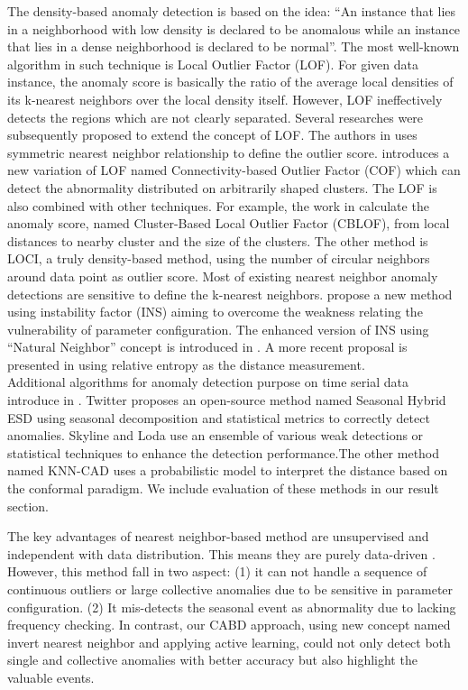 The density-based anomaly detection is based on the idea: “An instance that lies in a neighborhood with low density is declared to be anomalous while an instance that lies in a dense neighborhood is declared to be normal”. The most well-known algorithm in such technique is Local Outlier Factor (LOF)\cite{Breunig:2000:LID:335191.335388}. For given data instance, the anomaly score is basically the ratio of the average local densities of its k-nearest neighbors over the local density itself.  However, LOF ineffectively detects the regions which are not clearly separated. Several researches were subsequently proposed to extend the concept of LOF. The authors in \cite{jin2006ranking} uses symmetric nearest neighbor relationship to define the outlier score. \cite{tang2002enhancing} introduces a new variation of LOF named Connectivity-based Outlier Factor (COF)\cite{tang2001robust} which can detect the abnormality distributed on arbitrarily shaped clusters. The LOF is also combined with other techniques. For example, the work in \cite{he2002outlier}\cite{he2003discovering} calculate the anomaly score, named Cluster-Based Local Outlier Factor (CBLOF), from local distances to nearby cluster and the size of the clusters. The other method is LOCI, a truly density-based method, using the number of circular neighbors around data point as outlier score. Most of existing nearest neighbor anomaly detections are sensitive to define the k-nearest neighbors. \cite{ha2014robust} propose a new method using instability factor (INS) aiming to overcome the weakness relating the vulnerability of parameter configuration. The enhanced version of INS using “Natural Neighbor” concept is introduced in \cite{huang2016non}.
A more recent proposal is presented in \cite{wang2011statistical} using relative entropy as the distance measurement.\\

Additional algorithms for anomaly detection purpose on time serial data introduce in \cite{Lakhina:2004:DNT:1030194.1015492}\cite{1565683}. Twitter proposes an open-source method named Seasonal Hybrid ESD \cite{hochenbaum2017automatic} using seasonal decomposition and statistical metrics to correctly detect anomalies. Skyline \cite{skyline} and Loda \cite{Pevny2016} use an ensemble of various weak detections or statistical techniques to enhance the detection performance.The other method named KNN-CAD \cite{burnaev2016conformalized} uses a probabilistic model to interpret the distance based on the conformal paradigm. We include evaluation of these methods in our result section.
\par The key advantages of nearest neighbor-based method are unsupervised and independent with data distribution. This means they are purely data-driven \cite{chandola2009anomaly}. However, this method fall in two aspect: (1) it can not handle a sequence of continuous outliers or large collective anomalies due to be sensitive in parameter configuration. (2) It mis-detects the seasonal event as abnormality due to lacking frequency checking.  In contrast, our CABD approach, using new concept named invert nearest neighbor and applying active learning, could not only detect both single and collective anomalies with better accuracy but also highlight the valuable events. 

